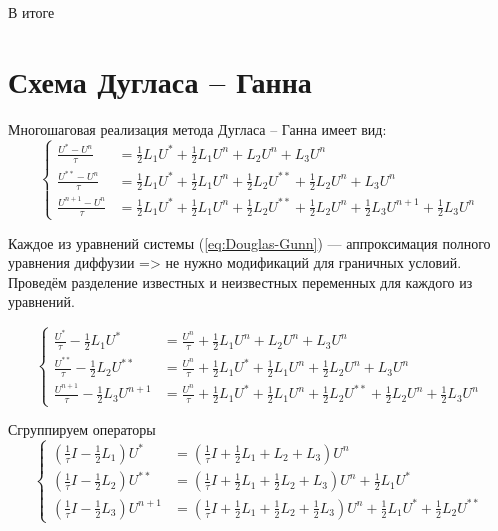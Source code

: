 \documentclass[a4paper,12pt]{article}
\begin{document}
В итоге




\section{Схема Дугласа -- Ганна}


Многошаговая реализация метода Дугласа -- Ганна имеет вид:
\begin{equation}
  \label{eq:Douglas-Gunn}
  \begin{cases}
    \frac{U^{*}   - U^n}{\tau} &= \frac{1}{2} L_1 U^{*}  + \frac{1}{2} L_1 U^n +  L_2 U^n +  L_3 U^n \\
    \frac{U^{**}  - U^n}{\tau} &= \frac{1}{2} L_1 U^{*}  + \frac{1}{2} L_1 U^n + 
                                \frac{1}{2} L_2 U^{**} + \frac{1}{2} L_2 U^n + L_3 U^n \\
    \frac{U^{n+1} - U^n}{\tau} &= \frac{1}{2} L_1 U^{*}   + \frac{1}{2} L_1 U^n +   
                                \frac{1}{2} L_2 U^{**}  + \frac{1}{2} L_2 U^n +  
                                \frac{1}{2} L_3 U^{n+1} + \frac{1}{2} L_3 U^n  

  \end{cases}
\end{equation}


Каждое из уравнений системы (\ref{eq:Douglas-Gunn}) --- аппроксимация полного уравнения диффузии => не нужно модификаций для граничных условий.
Проведём разделение известных и неизвестных переменных для каждого из уравнений.

\begin{equation*}
  \begin{cases}
    \frac{U^{*}}{\tau}  - \frac{1}{2} L_1 U^{*} &= \frac{U^n}{\tau} + \frac{1}{2} L_1 U^n +  L_2 U^n +  L_3 U^n \\
    \frac{U^{**}}{\tau} - \frac{1}{2} L_2 U^{**} &= \frac{U^n}{\tau} + \frac{1}{2} L_1 U^{*}  + \frac{1}{2} L_1 U^n + \frac{1}{2} L_2 U^n + L_3 U^n \\
    \frac{U^{n+1}}{\tau} - \frac{1}{2} L_3 U^{n+1} &= \frac{U^n}{\tau} + \frac{1}{2} L_1 U^{*}   + \frac{1}{2} L_1 U^n + \frac{1}{2} L_2 U^{**}  + \frac{1}{2} L_2 U^n + \frac{1}{2} L_3 U^n  
  \end{cases}
\end{equation*}

Сгруппируем операторы
\begin{equation}
  \label{eq:Douglas-Gunn3}
  \begin{cases}
    \left( \frac{1}{\tau} I - \frac{1}{2} L_1 \right) U^{*} &= 
        \left( \frac{1}{\tau} I + \frac{1}{2} L_1 +  L_2 + L_3 \right) U^n \\
    \left( \frac{1}{\tau} I - \frac{1}{2} L_2 \right) U^{**} &= 
        \left( \frac{1}{\tau} I + \frac{1}{2} L_1 + \frac{1}{2} L_2 + L_3 \right) U^n + \frac{1}{2} L_1 U^{*}\\
    \left( \frac{1}{\tau} I - \frac{1}{2} L_3 \right) U^{n+1} &= 
        \left( \frac{1}{\tau} I  + \frac{1}{2} L_1 + \frac{1}{2} L_2 + \frac{1}{2} L_3 \right) U^n + \frac{1}{2} L_1 U^{*}   + \frac{1}{2} L_2 U^{**}  
  \end{cases}
\end{equation}
\end{document}
